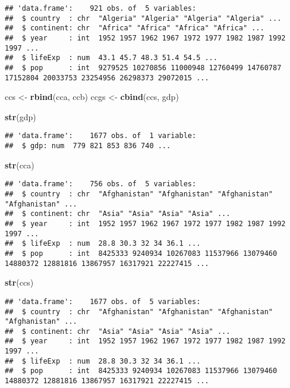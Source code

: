 \documentclass[
]{article}
\newenvironment{Shaded}{\begin{snugshade}}{\end{snugshade}}
\newcommand{\KeywordTok}[1]{\textcolor[rgb]{0.13,0.29,0.53}{\textbf{#1}}}
\newcommand{\NormalTok}[1]{#1}
\newcommand{\StringTok}[1]{\textcolor[rgb]{0.31,0.60,0.02}{#1}}
\begin{document}
\begin{verbatim}
## 'data.frame':    921 obs. of  5 variables:
##  $ country  : chr  "Algeria" "Algeria" "Algeria" "Algeria" ...
##  $ continent: chr  "Africa" "Africa" "Africa" "Africa" ...
##  $ year     : int  1952 1957 1962 1967 1972 1977 1982 1987 1992 1997 ...
##  $ lifeExp  : num  43.1 45.7 48.3 51.4 54.5 ...
##  $ pop      : int  9279525 10270856 11000948 12760499 14760787 17152804 20033753 23254956 26298373 29072015 ...
\end{verbatim}

\begin{Shaded}
\begin{Highlighting}[]
\NormalTok{ccs <-}\StringTok{ }\KeywordTok{rbind}\NormalTok{(cca, ccb)}
\NormalTok{ccgs <-}\StringTok{ }\KeywordTok{cbind}\NormalTok{(ccs, gdp)}

\KeywordTok{str}\NormalTok{(gdp)}
\end{Highlighting}
\end{Shaded}

\begin{verbatim}
## 'data.frame':    1677 obs. of  1 variable:
##  $ gdp: num  779 821 853 836 740 ...
\end{verbatim}

\begin{Shaded}
\begin{Highlighting}[]
\KeywordTok{str}\NormalTok{(cca)}
\end{Highlighting}
\end{Shaded}

\begin{verbatim}
## 'data.frame':    756 obs. of  5 variables:
##  $ country  : chr  "Afghanistan" "Afghanistan" "Afghanistan" "Afghanistan" ...
##  $ continent: chr  "Asia" "Asia" "Asia" "Asia" ...
##  $ year     : int  1952 1957 1962 1967 1972 1977 1982 1987 1992 1997 ...
##  $ lifeExp  : num  28.8 30.3 32 34 36.1 ...
##  $ pop      : int  8425333 9240934 10267083 11537966 13079460 14880372 12881816 13867957 16317921 22227415 ...
\end{verbatim}

\begin{Shaded}
\begin{Highlighting}[]
\KeywordTok{str}\NormalTok{(ccs)}
\end{Highlighting}
\end{Shaded}

\begin{verbatim}
## 'data.frame':    1677 obs. of  5 variables:
##  $ country  : chr  "Afghanistan" "Afghanistan" "Afghanistan" "Afghanistan" ...
##  $ continent: chr  "Asia" "Asia" "Asia" "Asia" ...
##  $ year     : int  1952 1957 1962 1967 1972 1977 1982 1987 1992 1997 ...
##  $ lifeExp  : num  28.8 30.3 32 34 36.1 ...
##  $ pop      : int  8425333 9240934 10267083 11537966 13079460 14880372 12881816 13867957 16317921 22227415 ...
\end{verbatim}
\end{document}

